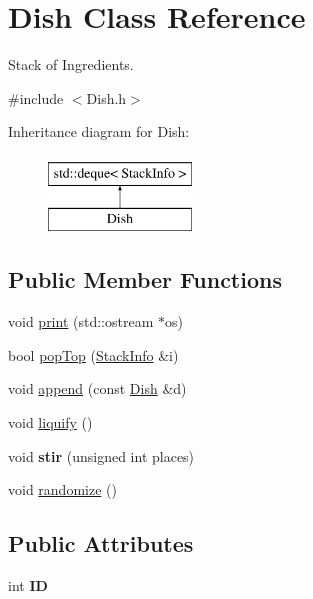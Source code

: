 \hypertarget{classDish}{\section{Dish Class Reference}
\label{classDish}
}


Stack of Ingredients.  




{\ttfamily \#include $<$Dish.\-h$>$}

Inheritance diagram for Dish\-:\begin{figure}[H]
\begin{center}
\leavevmode
\includegraphics[height=2.000000cm]{classDish}
\end{center}
\end{figure}
\subsection*{Public Member Functions}
\begin{DoxyCompactItemize}
\item 
void \hyperlink{classDish_a1f67fe39855ea4899a110591f960745b}{print} (std\-::ostream $\ast$os)
\item 
bool \hyperlink{classDish_a437c63798f934fdc3c80037d77a0d51e}{pop\-Top} (\hyperlink{structStackInfo}{Stack\-Info} \&i)
\item 
void \hyperlink{classDish_ac0abbc375bf201a4267b3b57c82d2a8f}{append} (const \hyperlink{classDish}{Dish} \&d)
\item 
void \hyperlink{classDish_a41b6fc6a531325d36d4607546291386b}{liquify} ()
\item 
\hypertarget{classDish_afbec6d938ea55ca2a848bedd954faa59}{void {\bfseries stir} (unsigned int places)}\label{classDish_afbec6d938ea55ca2a848bedd954faa59}

\item 
void \hyperlink{classDish_a1c60aa114f084117df18578e58f0725d}{randomize} ()
\end{DoxyCompactItemize}
\subsection*{Public Attributes}
\begin{DoxyCompactItemize}
\item 
\hypertarget{classDish_a14264990a9a7bc34f61336eeb6dcfcbd}{int {\bfseries I\-D}}\label{classDish_a14264990a9a7bc34f61336eeb6dcfcbd}

\end{DoxyCompactItemize}


